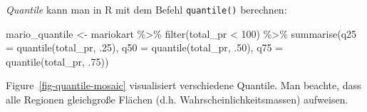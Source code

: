 \documentclass[
  letterpaper,
  DIV=11,
  numbers=noendperiod]{scrartcl}
\newenvironment{Shaded}{\begin{snugshade}}{\end{snugshade}}
\newcommand{\AttributeTok}[1]{\textcolor[rgb]{0.40,0.45,0.13}{#1}}
\newcommand{\DecValTok}[1]{\textcolor[rgb]{0.68,0.00,0.00}{#1}}
\newcommand{\FunctionTok}[1]{\textcolor[rgb]{0.28,0.35,0.67}{#1}}
\newcommand{\NormalTok}[1]{\textcolor[rgb]{0.00,0.23,0.31}{#1}}
\newcommand{\OtherTok}[1]{\textcolor[rgb]{0.00,0.23,0.31}{#1}}
\newcommand{\SpecialCharTok}[1]{\textcolor[rgb]{0.37,0.37,0.37}{#1}}
\theoremstyle{definition}
\theoremstyle{definition}
\theoremstyle{definition}
\theoremstyle{remark}
\begin{document}
\emph{Quantile} kann man in R mit dem Befehl \texttt{quantile()}
berechnen:

\begin{Shaded}
\begin{Highlighting}[]
\NormalTok{mario\_quantile }\OtherTok{\textless{}{-}} 
\NormalTok{mariokart }\SpecialCharTok{\%\textgreater{}\%} 
  \FunctionTok{filter}\NormalTok{(total\_pr }\SpecialCharTok{\textless{}} \DecValTok{100}\NormalTok{) }\SpecialCharTok{\%\textgreater{}\%} 
  \FunctionTok{summarise}\NormalTok{(}\AttributeTok{q25 =} \FunctionTok{quantile}\NormalTok{(total\_pr, .}\DecValTok{25}\NormalTok{),}
            \AttributeTok{q50 =} \FunctionTok{quantile}\NormalTok{(total\_pr, .}\DecValTok{50}\NormalTok{),}
            \AttributeTok{q75 =} \FunctionTok{quantile}\NormalTok{(total\_pr, .}\DecValTok{75}\NormalTok{))}
\end{Highlighting}
\end{Shaded}

Figure~\ref{fig-quantile-mosaic} visualisiert verschiedene Quantile. Man
beachte, dass alle Regionen gleichgroße Flächen (d.h.
Wahrscheinlichkeitsmassen) aufweisen.
\end{document}
